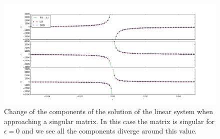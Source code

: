 \documentclass[10 pt]{article}
\begin{document}
\begin{figure}[H]
\vspace{-40pt}
\includegraphics[width = \linewidth]{approaching_singular}
\caption{Change of the components of the solution of the linear system when approaching a singular matrix. In this case the matrix is singular for $\epsilon = 0$ and we see all the components diverge around this value.}
\end{figure}
\end{document}
